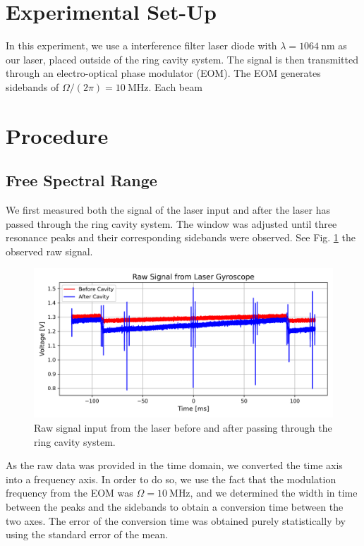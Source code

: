 \documentclass[a4paper]{report}
\numberwithin{equation}{section}
\begin{document}
\section{Experimental Set-Up}

In this experiment, we use a interference filter laser diode with $\lambda = \SI[]{1064}[]{\nano\metre}$ as our laser, placed 
outside of the ring cavity system. The signal is then transmitted through an electro-optical phase modulator (EOM). The EOM 
generates sidebands of $\Omega / (2\pi) = \SI{10}{\mega\hertz}$. Each beam 


\section{Procedure}

\subsection{Free Spectral Range}

We first measured both the signal of the laser input and after the laser
has passed through the ring cavity system. The window was adjusted until three resonance peaks and their corresponding sidebands
were observed. See Fig. \ref{fig:threeres_raw} the observed raw signal. 

\begin{figure}[h!]
	\centering
	\includegraphics[width=0.8\columnwidth]{threeres_raw.png}
	\caption{Raw signal input from the laser before and after passing through the ring 
			cavity system.}
	\label{fig:threeres_raw}
\end{figure}

As the raw data was provided in the time domain, we converted the time axis into a frequency axis.
In order to do so, we use the fact that the modulation frequency from the EOM was $\Omega = \SI{10}{\mega\hertz}$,
and we determined the width in time between the peaks and the sidebands to obtain a conversion time between 
the two axes. The error of the conversion time was obtained purely statistically by using the standard error of the mean. \par 
\end{document}
